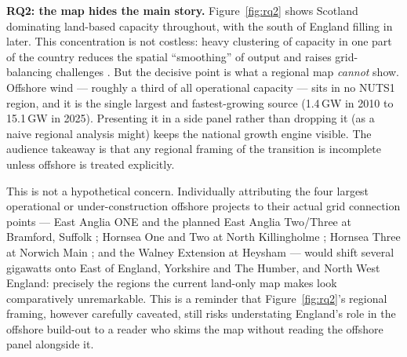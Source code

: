 \documentclass[11pt]{article}
\begin{document}
\textbf{RQ2: the map hides the main story.}\label{sec:rq2} Figure~\ref{fig:rq2} shows Scotland dominating land-based capacity throughout, with the south of England filling in later. This concentration is not costless: heavy clustering of capacity in one part of the country reduces the spatial ``smoothing'' of output and raises grid-balancing challenges \citep{commin2017}. But the decisive point is what a regional map \emph{cannot} show. Offshore wind --- roughly a third of all operational capacity --- sits in no NUTS1 region, and it is the single largest and fastest-growing source (1.4\,GW in 2010 to 15.1\,GW in 2025). Presenting it in a side panel rather than dropping it (as a naive regional analysis might) keeps the national growth engine visible. The audience takeaway is that any regional framing of the transition is incomplete unless offshore is treated explicitly.

This is not a hypothetical concern. Individually attributing the four largest operational or under-construction offshore projects to their actual grid connection points --- East Anglia ONE and the planned East Anglia Two/Three at Bramford, Suffolk \citep{eastanglia_bramford}; Hornsea One and Two at North Killingholme \citep{hornsea_killingholme}; Hornsea Three at Norwich Main \citep{hornsea3_norwich}; and the Walney Extension at Heysham \citep{walney_heysham} --- would shift several gigawatts onto East of England, Yorkshire and The Humber, and North West England: precisely the regions the current land-only map makes look comparatively unremarkable. This is a reminder that Figure~\ref{fig:rq2}'s regional framing, however carefully caveated, still risks understating England's role in the offshore build-out to a reader who skims the map without reading the offshore panel alongside it.
\end{document}
